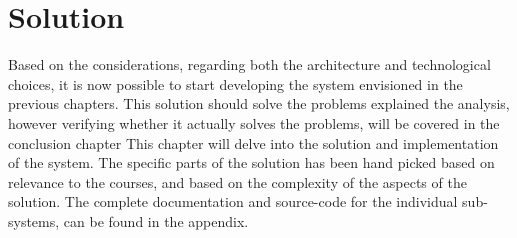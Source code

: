\chapter{Solution}

Based on the considerations, regarding both the architecture and technological choices, it is now possible to start developing the system envisioned in the previous chapters.
This solution should solve the problems explained the analysis, however verifying whether it actually solves the problems, will be covered in the conclusion chapter
This chapter will delve into the solution and implementation of the system.
The specific parts of the solution has been hand picked based on relevance to the courses, and based on the complexity of the aspects of the solution.
The complete documentation and source-code for the individual sub-systems, can be found in the appendix.
